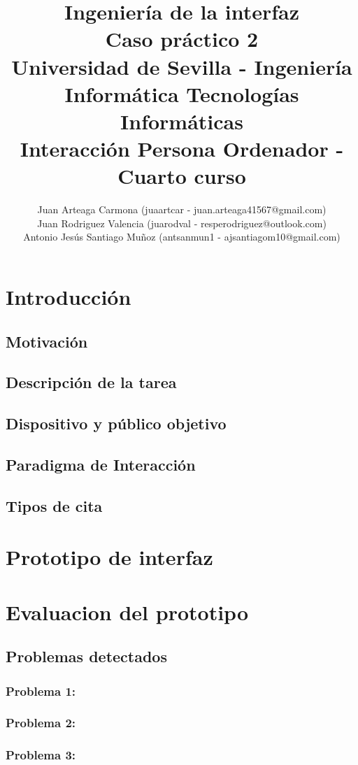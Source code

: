 \documentclass[a4paper,11pt]{article}
\title{
        \textbf{Ingeniería de la interfaz}\large\\
        \textbf{Caso práctico 2}\\
        \medskip
        Universidad de Sevilla - Ingeniería Informática Tecnologías Informáticas\\
        Interacción Persona Ordenador - Cuarto curso}
\author{Juan Arteaga Carmona (juaartcar - juan.arteaga41567@gmail.com)\\
        Juan Rodriguez Valencia (juarodval - resperodriguez@outlook.com)\\
        Antonio Jesús Santiago Muñoz (antsanmun1 - ajsantiagom10@gmail.com)\\
}
\begin{document}
\maketitle

\newpage
\tableofcontents
\listoffigures
\newpage



\section{Introducción}
\subsection{Motivación}
\subsection{Descripción de la tarea}
\subsection{Dispositivo y público objetivo}
\subsection{Paradigma de Interacción}
\subsection{Tipos de cita}

\section{Prototipo de interfaz}

\section{Evaluacion del prototipo}
\subsection{Problemas detectados}
\subsubsection{Problema 1:}
\subsubsection{Problema 2:}
\subsubsection{Problema 3:}
\end{document}
